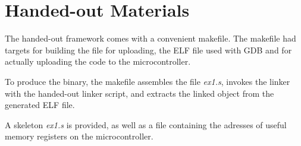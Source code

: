 \section{Handed-out Materials}
The handed-out framework comes with a convenient makefile.
The makefile had targets for building the file for uploading, the ELF file used with GDB and for actually uploading the code to the microcontroller.

To produce the binary, the makefile assembles the file \emph{ex1.s}, invokes the linker with the handed-out linker script, and extracts the linked object from the generated ELF file.

A skeleton \emph{ex1.s} is provided, as well as a file containing the adresses of useful memory registers on the microcontroller.

